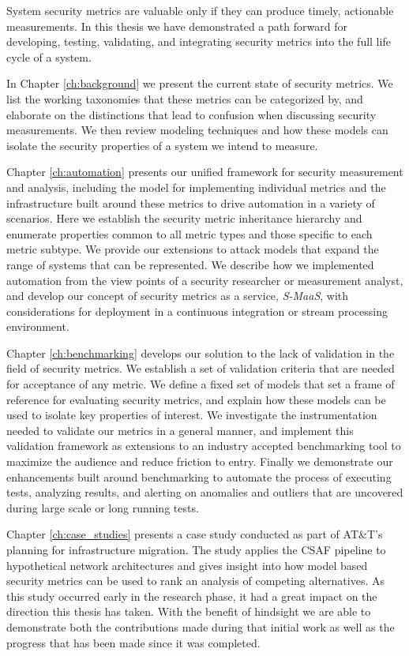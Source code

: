 
System security metrics are valuable only if they can produce timely, actionable measurements. In this thesis we have demonstrated a path forward for developing, testing, validating, and integrating security metrics into the full life cycle of a system. 

In Chapter \ref{ch:background} we present the current state of security metrics. We list the working taxonomies that these metrics can be categorized by, and elaborate on the distinctions that lead to confusion when discussing security measurements. We then review modeling techniques and how these models can isolate the security properties of a system we intend to measure. 

Chapter \ref{ch:automation} presents our unified framework for security measurement and analysis, including the model for implementing individual metrics and the infrastructure built around these metrics to drive automation in a variety of scenarios. Here we establish the security metric inheritance hierarchy and enumerate properties common to all metric types and those specific to each metric subtype. We provide our extensions to attack models that expand the range of systems that can be represented. We describe how we implemented automation from the view points of a security researcher or measurement analyst, and develop our concept of security metrics as a service, \textit{S-MaaS}, with considerations for deployment in a continuous integration or stream processing environment.

Chapter \ref{ch:benchmarking} develops our solution to the lack of validation in the field of security metrics. We establish a set of validation criteria that are needed for acceptance of any metric. We define a fixed set of models that set a frame of reference for evaluating security metrics, and explain how these models can be used to isolate key properties of interest. We investigate the instrumentation needed to validate our metrics in a general manner, and implement this validation framework as extensions to an industry accepted benchmarking tool to maximize the audience and reduce friction to entry. Finally we demonstrate our enhancements built around benchmarking to automate the process of executing tests, analyzing results, and alerting on anomalies and outliers that are uncovered during large scale or long running tests.

Chapter \ref{ch:case_studies} presents a case study conducted as part of AT\&T's planning for infrastructure migration. The study applies the CSAF\cite{Abraham_Nair_2015a} pipeline to hypothetical network architectures and gives insight into how model based security metrics can be used to rank an analysis of competing alternatives. As this study occurred early in the research phase, it had a great impact on the direction this thesis has taken. With the benefit of hindsight we are able to demonstrate both the contributions made during that initial work as well as the progress that has been made since it was completed. 



